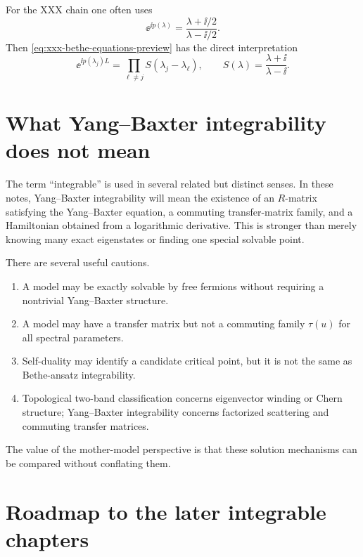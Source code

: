 For the XXX chain one often uses
\begin{equation}
\label{eq:xxx-momentum-rapidity-preview}
    \ee^{\ii p(\lambda)}
    =
    \frac{\lambda+\ii/2}{\lambda-\ii/2} .
\end{equation}
Then \cref{eq:xxx-bethe-equations-preview} has the direct interpretation
\begin{equation}
    \ee^{\ii p(\lambda_j)L}
    =
    \prod_{\ell\neq j}S(\lambda_j-\lambda_\ell),
    \qquad
    S(\lambda)=\frac{\lambda+\ii}{\lambda-\ii} .
\end{equation}

\section{What Yang--Baxter integrability does not mean}
\label{sec:what-integrability-does-not-mean}

The term ``integrable'' is used in several related but distinct senses.  In these
notes, Yang--Baxter integrability will mean the existence of an $R$-matrix
satisfying the Yang--Baxter equation, a commuting transfer-matrix family, and a
Hamiltonian obtained from a logarithmic derivative.  This is stronger than merely
knowing many exact eigenstates or finding one special solvable point.

There are several useful cautions.
\begin{enumerate}[label=(\roman*)]
    \item A model may be exactly solvable by free fermions without requiring a
    nontrivial Yang--Baxter structure.
    \item A model may have a transfer matrix but not a commuting family
    $\tau(u)$ for all spectral parameters.
    \item Self-duality may identify a candidate critical point, but it is not the
    same as Bethe-ansatz integrability.
    \item Topological two-band classification concerns eigenvector winding or
    Chern structure; Yang--Baxter integrability concerns factorized scattering
    and commuting transfer matrices.
\end{enumerate}
The value of the mother-model perspective is that these solution mechanisms can
be compared without conflating them.

\section{Roadmap to the later integrable chapters}
\label{sec:integrability-roadmap-preview}

